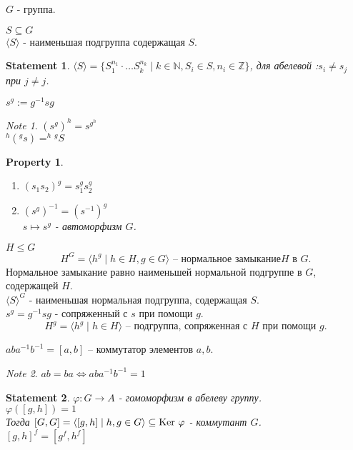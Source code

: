 \documentclass[11pt]{book}
\newcommand{\Z}{\mathbb{Z}}
\newcommand{\N}{\mathbb{N}}
\newcommand{\ke}{{\mathop{\text{\rm Ker}}}~}
\theoremstyle{definition}
\theoremstyle{plain}
\theoremstyle{plain}
\newtheorem*{st}{Statement}
\newtheorem*{prop}{Property}
\theoremstyle{definition}
\theoremstyle{remark}
\newtheorem*{note}{Note}
\begin{document}
$G$ - группа.
\begin{defn}
    $S \subseteq G$ \\
    $\langle S \rangle$ - наименьшая подгруппа содержащая $S$. 
\end{defn}
\begin{st}
    $\langle S \rangle = \{S_1 ^{n_1}\cdot \ldots  S_k^{n_k}\mid k \in  \N , S_i \in  S, n_i \in  \Z\}$, для абелевой :$s_i \ne s_j$ при $j \ne j$.
\end{st}
\begin{defn}
    $s ^g := g^{-1} s g$
\end{defn}
\begin{note}
    $(s^g)^h = s^{g^h}$\\
    $^h\!(^g\!s) = ^h\!^g\!S$
\end{note}
\begin{prop}$ $
    \begin{enumerate}
	\item $(s_1 s_2)^g = s_1 ^g s_2 ^g$ 
	\item $(s^g)^{-1} = (s^{-1})^g$\\
	    $s \mapsto s^g$ - автоморфизм $G $.
    \end{enumerate}
\end{prop}
\begin{defn}
    $H \le G$ 
    \[
	H^G = \langle h^g \mid h \in  H, g \in  G \rangle  \mbox{ -- нормальное замыкание} H \mbox{ в } G
    .\]  
    Нормальное замыкание равно наименьшей нормальной подгруппе в $G$, содержащей $H$.\\
    $\langle S \rangle ^G$ - наименьшая нормальная подгруппа, содержащая $S$.\\
    $s^g= g^{-1} s g$  - сопряженный с $s$ при помощи $g$.\\
    \[
	H^g=\langle h^g \mid h \in  H\rangle \mbox{ -- подгруппа, сопряженная с $H$ при помощи $g$}
    .\] 
\end{defn}
\begin{defn}
    $aba^{-1}b^{-1} = [a, b] $ -- коммутатор элементов $a, b$.
\end{defn}
\begin{note}
    $ab = ba \Leftrightarrow aba^{-1}b^{-1} = 1$\\
\end{note}
\begin{st}
    $\varphi  : G \to A$ - гомоморфизм в абелеву группу.\\
    $\varphi([g, h]) = 1$ \\
    Тогда $[G, G] = \langle [g, h]\mid h, g \in  G \rangle \subseteq \ke \varphi $ - коммутант $G$. \\
    $[g, h] ^f = [g^f , h^f]$
\end{st}
\end{document}
